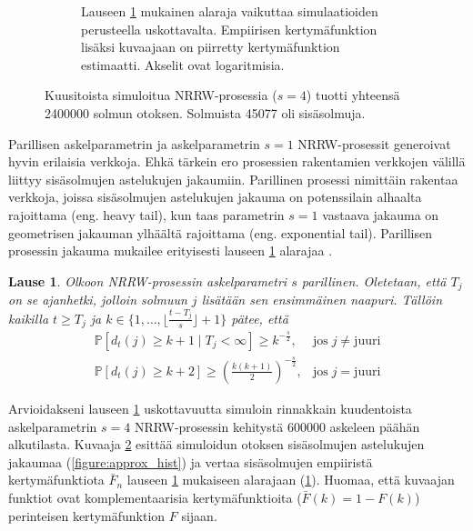 \documentclass[finnish, 12pt, a4paper, sci, utf8, pdfa]{aaltothesis}
\newcommand*{\prob}{\mathbb{P}}
\newtheorem{theorem}{Lause}
\begin{document}
\begin{figure}[htb]
\begin{subfigure}[b]{0.47\textwidth}
      \caption{Lauseen \ref{theorem:asteluku} mukainen alaraja vaikuttaa simulaatioiden perusteella uskottavalta. Empiirisen kertymäfunktion lisäksi kuvaajaan on piirretty kertymäfunktion estimaatti. Akselit ovat logaritmisia. \label{figure:approx_cdf}}
   \end{subfigure}
   \caption{Kuusitoista simuloitua NRRW-prosessia ($ s = 4 $) tuotti yhteensä 2400000 solmun otoksen. Solmuista 45077 oli sisäsolmuja.}
   \label{figure:asteluku-sim}
\end{figure}

Parillisen askelparametrin ja askelparametrin $ s = 1 $ NRRW-prosessit generoivat hyvin erilaisia verkkoja. Ehkä tärkein ero prosessien rakentamien verkkojen välillä liittyy sisäsolmujen
astelukujen jakaumiin. Parillinen prosessi nimittäin rakentaa verkkoja, joissa sisäsolmujen astelukujen jakauma on potenssilain alhaalta rajoittama (eng. heavy tail), kun taas parametrin $ s = 1 $ vastaava jakauma on geometrisen jakauman ylhäältä rajoittama (eng. exponential tail). Parillisen prosessin jakauma mukailee erityisesti lauseen \ref{theorem:asteluku} alarajaa \cite{Iacobelli}.

\begin{theorem}
   Olkoon NRRW-prosessin askelparametri $ s $ parillinen. Oletetaan, että $ T_{j} $ on se ajanhetki, jolloin solmuun $ j $ lisätään sen ensimmäinen naapuri. Tällöin kaikilla $ t \geq T_{j} $ ja $ k \in \{1,\ldots,\lfloor \frac{t-T_{j}}{s} \rfloor + 1\} $ pätee, että
   \[
      \renewcommand{\arraystretch}{2.0}
      \begin{array}{lr}
         \prob \left[ d_{t}(j) \geq k + 1 \mid T_{j} < \infty \right] \geq k^{-\frac{s}{2}},             & \text{jos} \; j \neq \text{juuri} \\
         \prob \left[ d_{t}(j) \geq k + 2 \right] \geq \left( \frac{k(k+1)}{2} \right)^{-\frac{s}{2}},   & \text{jos} \; j = \text{juuri}
      \end{array}
   \]
   \label{theorem:asteluku}
\end{theorem}
Arvioidakseni lauseen \ref{theorem:asteluku} uskottavuutta simuloin rinnakkain kuudentoista askelparametrin $ s = 4 $ NRRW-prosessin kehitystä 600000 askeleen päähän alkutilasta. 
Kuvaaja \ref{figure:asteluku-sim} esittää simuloidun otoksen sisäsolmujen astelukujen jakaumaa (\ref{figure:approx_hist}) ja vertaa sisäsolmujen empiiristä kertymäfunktiota 
$ \bar{F}_{n} $ lauseen \ref{theorem:asteluku} mukaiseen alarajaan (\ref{figure:approx_cdf}). Huomaa, että kuvaajan funktiot ovat komplementaarisia kertymäfunktioita 
($ \bar{F}(k) = 1 - F(k) $) perinteisen kertymäfunktion $ F $ sijaan. 
\end{document}
